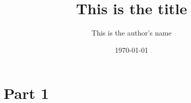 \documentclass[twoside]{book}
\title{This is the title}
\author{This is the author's name}
\date{\today}
\begin{document}
\maketitle

\tableofcontents

\part{Part 1}


\end{document}
